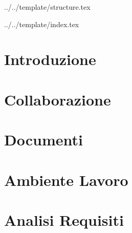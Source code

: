


\def\DOCUMENTO{Norme di Progetto}
\def\VERSIONE{1.0.0}

\def\DESCRIZIONE{Documento contenente l’insieme di norme stabilite dal gruppo \GRUPPO per la realizzazione di \PROGETTO.}

\def\REDATTORE {Bogdan Suierica \\ & Emanuele Crespan}
\def\VERIFICATORE {Matteo Agostinetto}
\def\RESPONSABILE {Valerio Burlin}

\def\USO {Interno}

\def\DISTRIBUZIONE {\GRUPPO{}\\ & \COMMITTENTE{}\\}

\def\DESCRIZIONE {Documento contenente l'insieme di norme stabilite dal gruppo \GRUPPO\ per la realizzazione di \PROGETTO.}


\def\INDICE	{true}
\def\TABELLE {true}
\def\FIGURE {true}


 {../../template/structure.tex}


 {../../template/index.tex}



\section{Introduzione}

\newpage
\section{Collaborazione}

\newpage
\section{Documenti}

\newpage
\section{Ambiente Lavoro}

\newpage
\section{Analisi Requisiti}






